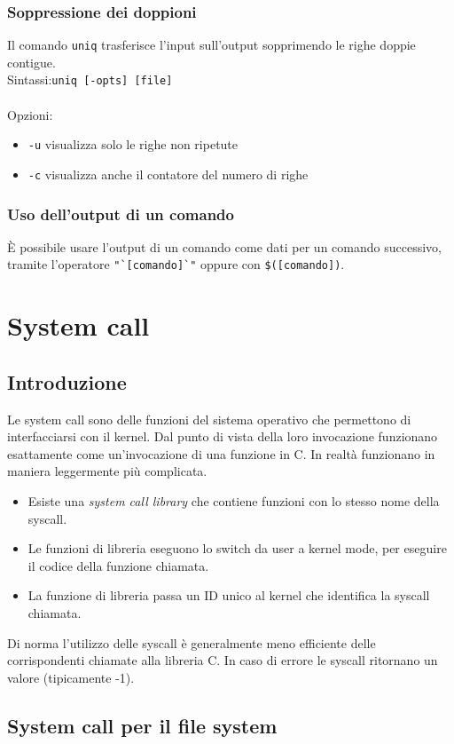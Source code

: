 \documentclass[a4paper, 10pt]{article}
\begin{document}
\subsubsection{Soppressione dei doppioni} Il comando \verb|uniq| trasferisce l'input sull'output sopprimendo le righe doppie contigue. \\
Sintassi:\verb|uniq [-opts] [file]| \\ \\
Opzioni:
\begin{itemize}
\item \verb|-u| visualizza solo le righe non ripetute
\item \verb|-c| visualizza anche il contatore del numero di righe
\end{itemize}
\subsubsection{Uso dell'output di un comando}
È possibile usare l'output di un comando come dati per un comando successivo, tramite l'operatore \verb|"`[comando]`"| oppure con  \verb|$([comando])|.
\section{System call}
\subsection{Introduzione}
Le system call sono delle funzioni del sistema operativo che permettono di interfacciarsi con il kernel.
Dal punto di vista della loro invocazione funzionano esattamente come un'invocazione di una funzione in C. In realtà funzionano in maniera leggermente più complicata.
\begin{itemize}
\item Esiste una \textit{system call library} che contiene funzioni con lo stesso nome della syscall.
\item Le funzioni di libreria eseguono lo switch da user a kernel mode, per eseguire il codice della funzione chiamata.
\item La funzione di libreria passa un ID unico al kernel che identifica la syscall chiamata.
\end{itemize}
Di norma l'utilizzo delle syscall è generalmente meno efficiente delle corrispondenti chiamate alla libreria C.
In caso di errore le syscall ritornano un valore (tipicamente -1).

\subsection{System call per il file system}
\end{document}
